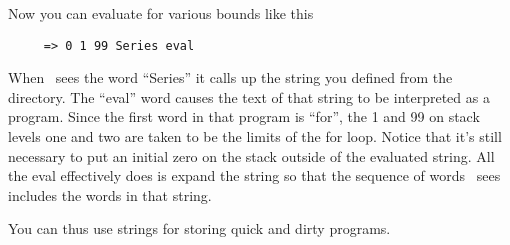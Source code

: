 Now you can evaluate for various bounds like this

\begin{verbatim}
     => 0 1 99 Series eval
\end{verbatim}

When \CLAC\ sees the word ``Series'' it calls up the string you defined from the directory. The
``eval'' word causes the text of that string to be interpreted as a program. Since the first
word in that program is ``for'', the 1 and 99 on stack levels one and two are taken to be the
limits of the for loop. Notice that it's still necessary to put an initial zero on the stack
outside of the evaluated string. All the eval effectively does is expand the string so that the
sequence of words \CLAC\ sees includes the words in that string.

You can thus use strings for storing quick and dirty programs.
